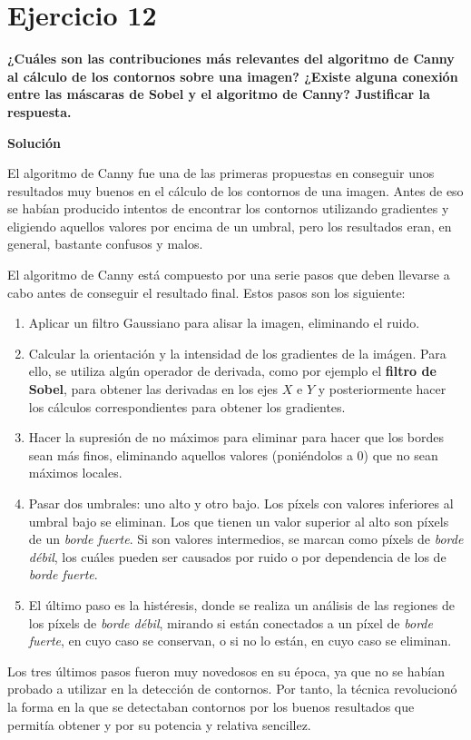 \documentclass[11pt,a4paper]{article}
\newcommand{\answer}{\noindent\textbf{Solución}}
\newcommand{\question}[1]{\noindent\textbf{#1}}
\newcommand{\nonumbersection}[1]{\section*{#1}\addcontentsline{toc}{section}{#1}}
\begin{document}
\nonumbersection{Ejercicio 12}

\question{¿Cuáles son las contribuciones más relevantes del algoritmo de
Canny al cálculo de los contornos sobre una imagen? ¿Existe alguna
conexión entre las máscaras de Sobel y el algoritmo de Canny? Justificar
la respuesta.}

\answer

El algoritmo de Canny fue una de las primeras propuestas en conseguir unos resultados muy buenos en el
cálculo de los contornos de una imagen. Antes de eso se habían producido intentos de encontrar los contornos utilizando
gradientes y eligiendo aquellos valores por encima de un umbral, pero los resultados eran, en general, bastante confusos
y malos.

El algoritmo de Canny está compuesto por una serie pasos que deben llevarse a cabo antes de conseguir el resultado
final. Estos pasos son los siguiente:

\begin{enumerate}
	\item Aplicar un filtro Gaussiano para alisar la imagen, eliminando el ruido.
	\item Calcular la orientación y la intensidad de los gradientes de la imágen. Para ello, se utiliza
	algún operador de derivada, como por ejemplo el \textbf{filtro de Sobel}, para obtener las derivadas en
	los ejes $X$ e $Y$ y posteriormente hacer los cálculos correspondientes para obtener los gradientes.
	\item Hacer la supresión de no máximos para eliminar para hacer que los bordes sean más finos, eliminando
	aquellos valores (poniéndolos a 0) que no sean máximos locales.
	\item Pasar dos umbrales: uno alto y otro bajo. Los píxels con valores inferiores al umbral bajo se eliminan. Los
	que tienen un valor superior al alto son píxels de un \textit{borde fuerte}. Si son valores intermedios, se marcan
	como píxels de \textit{borde débil}, los cuáles pueden ser causados por ruido o por dependencia de los de
	\textit{borde fuerte}.
	\item El último paso es la histéresis, donde se realiza un análisis de las regiones de los píxels de \textit{borde débil},
	mirando si están conectados a un píxel de \textit{borde fuerte}, en cuyo caso se conservan, o si no lo están, en cuyo
	caso se eliminan.
\end{enumerate}

Los tres últimos pasos fueron muy novedosos en su época, ya que no se habían probado a utilizar en la detección
de contornos. Por tanto, la técnica revolucionó la forma en la que se detectaban contornos por los buenos resultados
que permitía obtener y por su potencia y relativa sencillez.
\end{document}
